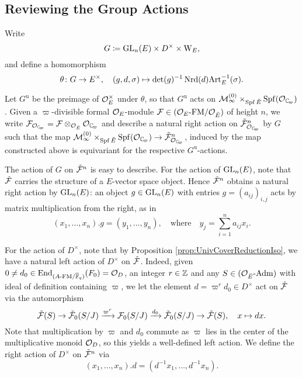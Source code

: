 \documentclass[../main.tex]{subfiles}
\begin{document}

\subsection{Reviewing the Group Actions} %
\label{ssub:Group Actions on the Universal Cover}
Write
\begin{equation*}
  G \coloneqq \operatorname{GL}_n(E) \times D^\times \times \mathrm W_E,
\end{equation*}
and define a homomorphism
\begin{equation*}
  \theta \colon G \to E^\times, \quad (g,d,\sigma) \mapsto \det(g)^{-1} \operatorname{Nrd}(d)
  \mathrm{Art}^{-1}_E(\sigma).
\end{equation*}

Let $G^{\mathrm u}$ be the preimage of $\mathcal{O}_E^\times$ under $\theta$, so that 
$G^{\mathrm u}$ acts on $\cM_{\infty}^{(0)} \times_{\Spf \br E} \Spf(\cO_\Cp)$. 
Given a $\varpi$-divisible formal $\mathcal{O}_E$-module $\mathcal{F} \in {({\mathcal{O}_E}\textnormal-\allowbreak\mathrm{FM}/{\mathcal{O}_{{\breve {E}}}})}$ of height $n$, we write $\cF_{\cO_\Cp} = \cF \otimes_{\cO_\br E}
\cO_\Cp$ and describe a natural right action on $\tilde \cF_{\cO_\Cp}^n$ by $G$ 
such that the map $\cM_{\infty}^{(0)} \times_{\spf \br E} \Spf(\cO_\Cp) \to
\tilde \cF_{\cO_\Cp}^n$,
induced by the map constructed above is equivariant for the respective
$G^{\mathrm u}$-actions.

The action of $G$ on $\tilde {\mathcal{F}}^n$ is easy to describe. For the action of
$\operatorname{GL}_n(E)$, note that $\tilde {\mathcal{F}}$ carries the structure of a $E$-vector space
object. Hence $\tilde {\mathcal{F}}^n$ obtains a natural right action by $\operatorname{GL}_n(E)$: an
object $g \in \operatorname{GL}_n(E)$ with entries $g = (a_{ij})_{i,j}$ acts by matrix
multiplication from the right, as in 
\begin{equation}\label{eq:UnivCoverGLnAction}
  (x_1, \dots, x_n).g = (y_1, \dots, y_n), \quad
  \text{where} \quad y_j = \sum_{i=1}^n a_{ij} x_i. 
\end{equation}

For the action of $D^\times$, note that by Proposition
\ref{prop:UnivCoverReductionIso}, we have 
a natural left action of $D^\times$ on $\tilde {\mathcal{F}}$. 
Indeed, given $0 \neq d_0 \in \operatorname{End}_{{({A}\textnormal-\allowbreak\mathrm{FM}/{{\overline {\mathbb{F}}_q}})}}(F_0) = \mathcal{O}_D$, an
integer $r \in \mathbb{Z}$ and any $S \in {({\mathcal{O}_{\breve {E}}}\textnormal-\allowbreak\mathrm{Adm})}$ with ideal of definition
containing $\varpi$, 
we let the element $d = \varpi^r d_0 \in D^\times$ act on $\tilde {\mathcal{F}}$ via the
automorphism
\begin{equation*}
  \tilde {\mathcal{F}}(S) \to \tilde {\mathcal{F}}_0(S/J) \xrightarrow{\varpi^{r}} \mathcal{F}_0(S/J) \xrightarrow{d_0}
  \tilde {\mathcal{F}}_0(S/J) \to \tilde {\mathcal{F}}(S), \quad x \mapsto dx.
\end{equation*}
Note that multiplication by $\varpi$ and $d_0$ commute as $\varpi$ lies in the 
center of the multiplicative monoid $\mathcal{O}_D$, so this yields a well-defined
left action. We define the right action of $D^\times$ on $\tilde {\mathcal{F}}^n$ via
\begin{equation*}
  (x_1, \dots, x_n).d = (d^{-1} x_1, \dots, d^{-1} x_n).
\end{equation*}
\end{document}
